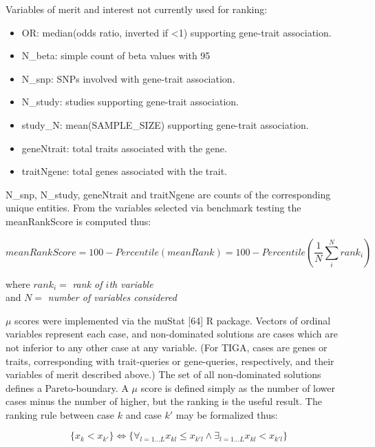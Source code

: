 Variables of merit and interest not currently used for ranking:

\begin{itemize}
\item OR: median(odds ratio, inverted if <1) supporting gene-trait association.
\item N\_beta: simple count of beta values with 95%
\item N\_snp: SNPs involved with gene-trait association.
\item N\_study: studies supporting gene-trait association.
\item study\_N: mean(SAMPLE\_SIZE) supporting gene-trait association.
\item geneNtrait: total traits associated with the gene.
\item traitNgene: total genes associated with the trait.
\end{itemize}

N\_snp, N\_study, geneNtrait and traitNgene are counts of the corresponding unique entities. From the variables selected via benchmark testing the meanRankScore is computed thus:

\begin{equation}
    meanRankScore = 100 - Percentile(meanRank) = 100 - Percentile(\frac{1}{N} \sum_{i}^{N} rank_{i})
\end{equation}

\begin{center}
    where $ rank_{i} = $ \emph{rank of $ i $th variable} \\
    and $ N = $ \emph{number of variables considered}
\end{center}

$\mu$ scores were implemented via the muStat [64] R package. Vectors of ordinal variables represent each case, and non-dominated solutions are cases which are not inferior to any other case at any variable. (For TIGA, cases are genes or traits, corresponding with trait-queries or gene-queries, respectively, and their variables of merit described above.) The set of all non-dominated solutions defines a Pareto-boundary. A $\mu$ score is defined simply as the number of lower cases minus the number of higher, but the ranking is the useful result. The ranking rule between case $k$ and case $k'$ may be formalized thus:

\begin{equation}
    \{ x_k < x_{k'} \} \Leftrightarrow \{ \forall_{l=1...L} x_{kl} \leq x_{k'l} \wedge \exists_{l=1...L} x_{kl} < x_{k'l} \}
\end{equation}


